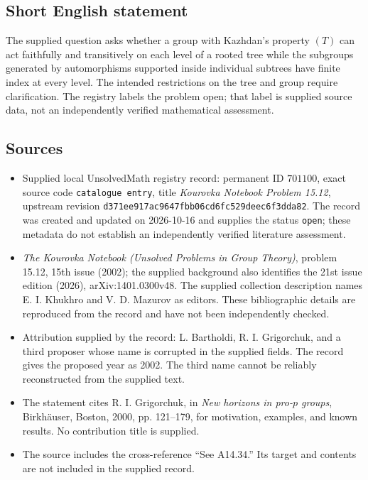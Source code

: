 \documentclass[11pt]{article}
\begin{document}
\subsection{Short English statement}
The supplied question asks whether a group with Kazhdan's property \((T)\) can act faithfully and transitively on each level of a rooted tree while the subgroups generated by automorphisms supported inside individual subtrees have finite index at every level. The intended restrictions on the tree and group require clarification. The registry labels the problem open; that label is supplied source data, not an independently verified mathematical assessment.
\subsection{Sources}
\begin{itemize}
\item Supplied local UnsolvedMath registry record: permanent ID \(701100\), exact source code \texttt{catalogue entry}, title \emph{Kourovka Notebook Problem 15.12}, upstream revision \texttt{d371ee917ac9647fbb06cd6fc529deec6f3dda82}. The record was created and updated on 2026-10-16 and supplies the status \texttt{open}; these metadata do not establish an independently verified literature assessment.
\item \emph{The Kourovka Notebook (Unsolved Problems in Group Theory)}, problem 15.12, 15th issue (2002); the supplied background also identifies the 21st issue edition (2026), arXiv:1401.0300v48. The supplied collection description names E. I. Khukhro and V. D. Mazurov as editors. These bibliographic details are reproduced from the record and have not been independently checked.
\item Attribution supplied by the record: L. Bartholdi, R. I. Grigorchuk, and a third proposer whose name is corrupted in the supplied fields. The record gives the proposed year as 2002. The third name cannot be reliably reconstructed from the supplied text.
\item The statement cites R. I. Grigorchuk, in \emph{New horizons in pro-\(p\) groups}, Birkh\"auser, Boston, 2000, pp. 121--179, for motivation, examples, and known results. No contribution title is supplied.
\item The source includes the cross-reference ``See A14.34.'' Its target and contents are not included in the supplied record.
\end{itemize}
\end{document}
